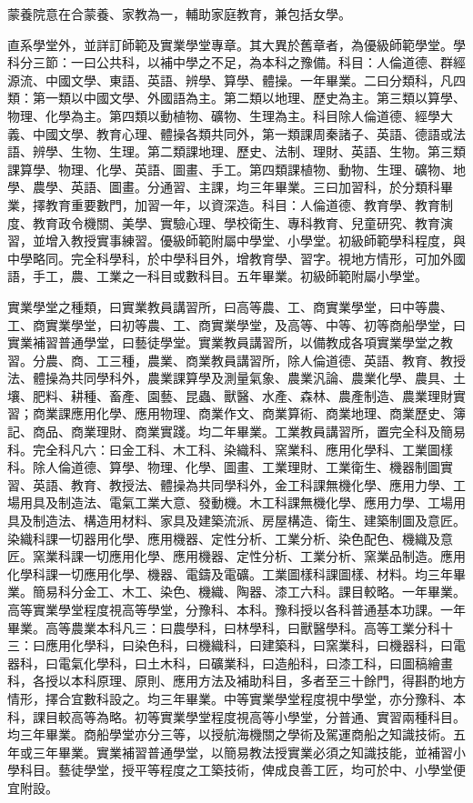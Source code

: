 \begin{pinyinscope}
蒙養院意在合蒙養、家教為一，輔助家庭教育，兼包括女學。

直系學堂外，並詳訂師範及實業學堂專章。其大異於舊章者，為優級師範學堂。學科分三節：一曰公共科，以補中學之不足，為本科之豫備。科目：人倫道德、群經源流、中國文學、東語、英語、辨學、算學、體操。一年畢業。二曰分類科，凡四類：第一類以中國文學、外國語為主。第二類以地理、歷史為主。第三類以算學、物理、化學為主。第四類以動植物、礦物、生理為主。科目除人倫道德、經學大義、中國文學、教育心理、體操各類共同外，第一類課周秦諸子、英語、德語或法語、辨學、生物、生理。第二類課地理、歷史、法制、理財、英語、生物。第三類課算學、物理、化學、英語、圖畫、手工。第四類課植物、動物、生理、礦物、地學、農學、英語、圖畫。分通習、主課，均三年畢業。三曰加習科，於分類科畢業，擇教育重要數門，加習一年，以資深造。科目：人倫道德、教育學、教育制度、教育政令機關、美學、實驗心理、學校衛生、專科教育、兒童研究、教育演習，並增入教授實事練習。優級師範附屬中學堂、小學堂。初級師範學科程度，與中學略同。完全科學科，於中學科目外，增教育學、習字。視地方情形，可加外國語，手工，農、工業之一科目或數科目。五年畢業。初級師範附屬小學堂。

實業學堂之種類，曰實業教員講習所，曰高等農、工、商實業學堂，曰中等農、工、商實業學堂，曰初等農、工、商實業學堂，及高等、中等、初等商船學堂，曰實業補習普通學堂，曰藝徒學堂。實業教員講習所，以備教成各項實業學堂之教習。分農、商、工三種，農業、商業教員講習所，除人倫道德、英語、教育、教授法、體操為共同學科外，農業課算學及測量氣象、農業汎論、農業化學、農具、土壤、肥料、耕種、畜產、園藝、昆蟲、獸醫、水產、森林、農產制造、農業理財實習；商業課應用化學、應用物理、商業作文、商業算術、商業地理、商業歷史、簿記、商品、商業理財、商業實踐。均二年畢業。工業教員講習所，置完全科及簡易科。完全科凡六：曰金工科、木工科、染織科、窯業科、應用化學科、工業圖樣科。除人倫道德、算學、物理、化學、圖畫、工業理財、工業衛生、機器制圖實習、英語、教育、教授法、體操為共同學科外，金工科課無機化學、應用力學、工場用具及制造法、電氣工業大意、發動機。木工科課無機化學、應用力學、工場用具及制造法、構造用材料、家具及建築流派、房屋構造、衛生、建築制圖及意匠。染織科課一切器用化學、應用機器、定性分析、工業分析、染色配色、機織及意匠。窯業科課一切應用化學、應用機器、定性分析、工業分析、窯業品制造。應用化學科課一切應用化學、機器、電鑄及電礦。工業圖樣科課圖樣、材料。均三年畢業。簡易科分金工、木工、染色、機織、陶器、漆工六科。課目較略。一年畢業。高等實業學堂程度視高等學堂，分豫科、本科。豫科授以各科普通基本功課。一年畢業。高等農業本科凡三：曰農學科，曰林學科，曰獸醫學科。高等工業分科十三：曰應用化學科，曰染色科，曰機織科，曰建築科，曰窯業科，曰機器科，曰電器科，曰電氣化學科，曰土木科，曰礦業科，曰造船科，曰漆工科，曰圖稿繪畫科，各授以本科原理、原則、應用方法及補助科目，多者至三十餘門，得斟酌地方情形，擇合宜數科設之。均三年畢業。中等實業學堂程度視中學堂，亦分豫科、本科，課目較高等為略。初等實業學堂程度視高等小學堂，分普通、實習兩種科目。均三年畢業。商船學堂亦分三等，以授航海機關之學術及駕運商船之知識技術。五年或三年畢業。實業補習普通學堂，以簡易教法授實業必須之知識技能，並補習小學科目。藝徒學堂，授平等程度之工築技術，俾成良善工匠，均可於中、小學堂便宜附設。


\end{pinyinscope}

